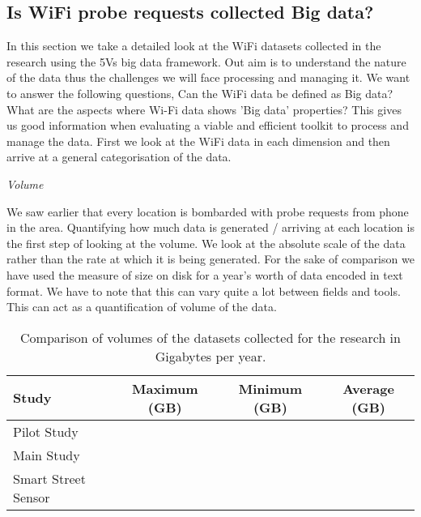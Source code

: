 
\subsection{Is WiFi probe requests collected Big data?}

In this section we take a detailed look at the WiFi datasets collected in the research using the 5Vs big data framework.
Out aim is to understand the nature of the data thus the challenges we will face processing and managing it.
We want to answer the following questions,
Can the WiFi data be defined as Big data?
What are the aspects where Wi-Fi data shows 'Big data' properties?
This gives us good information when evaluating a viable and efficient toolkit to process and manage the data.
First we look at the WiFi data in each dimension and then arrive at a general categorisation of the data.

\vspace{0.5em}\noindent\textit{Volume}\vspace{0.5em}

We saw earlier that every location is bombarded with probe requests from phone in the area.
Quantifying how much data is generated / arriving at each location is the first step of looking at the volume.
We look at the absolute scale of the data rather than the rate at which it is being generated.
For the sake of comparison we have used the measure of size on disk for a year's worth of data encoded in text format.
We have to note that this can vary quite a lot between fields and tools.
This can act as a quantification of volume of the data.

\begin{table}[h]
  \footnotesize
  \begin{center}
    \begin{tabular}{lccc}
      \toprule
      Study & Maximum (GB) & Minimum (GB) & Average (GB) \\
      \midrule
      Pilot Study & & & \\
      Main Study & & & \\
      Smart Street Sensor & & & \\
      \bottomrule
    \end{tabular}
  \end{center}
  \caption{Comparison of volumes of the datasets collected for the research in Gigabytes per year.}
  \label{tab:volume-table}
\end{table}

